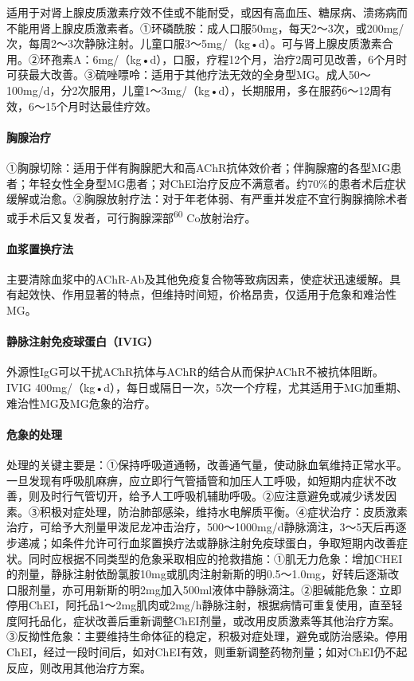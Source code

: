 适用于对肾上腺皮质激素疗效不佳或不能耐受，或因有高血压、糖尿病、溃疡病而不能用肾上腺皮质激素者。①环磷酰胺：成人口服50mg，每天2～3次，或200mg/次，每周2～3次静脉注射。儿童口服3～5mg/（kg•d）。可与肾上腺皮质激素合用。②环孢素A：6mg/（kg•d），口服，疗程12个月，治疗2周可见改善，6个月时可获最大改善。③硫唑嘌呤：适用于其他疗法无效的全身型MG。成人50～100mg/d，分2次服用，儿童1～3mg/（kg•d），长期服用，多在服药6～12周有效，6～15个月时达最佳疗效。

\paragraph{胸腺治疗}

①胸腺切除：适用于伴有胸腺肥大和高AChR抗体效价者；伴胸腺瘤的各型MG患者；年轻女性全身型MG患者；对ChEI治疗反应不满意者。约70\%的患者术后症状缓解或治愈。②胸腺放射疗法：对于年老体弱、有严重并发症不宜行胸腺摘除术者或手术后又复发者，可行胸腺深部\textsuperscript{60}
Co放射治疗。

\paragraph{血浆置换疗法}

主要清除血浆中的AChR-Ab及其他免疫复合物等致病因素，使症状迅速缓解。具有起效快、作用显著的特点，但维持时间短，价格昂贵，仅适用于危象和难治性MG。

\paragraph{静脉注射免疫球蛋白（IVIG）}

外源性IgG可以干扰AChR抗体与AChR的结合从而保护AChR不被抗体阻断。IVIG
400mg/（kg•d），每日或隔日一次，5次一个疗程，尤其适用于MG加重期、难治性MG及MG危象的治疗。

\paragraph{危象的处理}

处理的关键主要是：①保持呼吸道通畅，改善通气量，使动脉血氧维持正常水平。一旦发现有呼吸肌麻痹，应立即行气管插管和加压人工呼吸，如短期内症状不改善，则及时行气管切开，给予人工呼吸机辅助呼吸。②应注意避免或减少诱发因素。③积极对症处理，防治肺部感染，维持水电解质平衡。④症状治疗：皮质激素治疗，可给予大剂量甲泼尼龙冲击治疗，500～1000mg/d静脉滴注，3～5天后再逐步递减；如条件允许可行血浆置换疗法或静脉注射免疫球蛋白，争取短期内改善症状。同时应根据不同类型的危象采取相应的抢救措施：①肌无力危象：增加CHEI的剂量，静脉注射依酚氯胺10mg或肌肉注射新斯的明0.5～1.0mg，好转后逐渐改口服剂量，亦可用新斯的明2mg加入500ml液体中静脉滴注。②胆碱能危象：立即停用ChEI，阿托品1～2mg肌肉或2mg/h静脉注射，根据病情可重复使用，直至轻度阿托品化，症状改善后重新调整ChEI剂量，或改用皮质激素等其他治疗方案。③反拗性危象：主要维持生命体征的稳定，积极对症处理，避免或防治感染。停用ChEI，经过一段时间后，如对ChEI有效，则重新调整药物剂量；如对ChEI仍不起反应，则改用其他治疗方案。
\protect\hypertarget{text00129.html}{}{}

